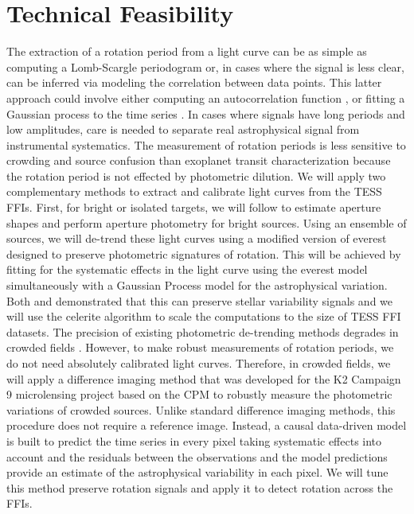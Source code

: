 \documentclass[useAMS, usenatbib, preprint, 12pt]{aastex}
\begin{document}
\section{Technical Feasibility}
The extraction of a rotation period from a light curve can be as simple as
computing a Lomb-Scargle periodogram or, in cases where the signal is less
clear, can be inferred via modeling the correlation between data points.
This latter approach could involve either computing an autocorrelation
function \citep{mcquillan2013}, or fitting a Gaussian process to the time
series \citep{angus2017, foreman-mackey2017}.
In cases where signals have long periods and low amplitudes, care is needed to
separate real astrophysical signal from instrumental systematics.
The measurement of rotation periods is less sensitive to crowding and source
confusion than exoplanet transit characterization because the rotation period
is not effected by photometric dilution.
We will apply two complementary methods to extract and calibrate light curves
from the TESS FFIs.
First, for bright or isolated targets, we will follow \citet{montet2017} to
estimate aperture shapes and perform aperture photometry for bright sources.
Using an ensemble of sources, we will de-trend these light curves using a
modified version of \textsf{everest} \citep{luger2016, luger2017} designed to
preserve photometric signatures of rotation.
This will be achieved by fitting for the systematic effects in the light curve
using the \textsf{everest} model simultaneously with a Gaussian Process model
for the astrophysical variation.
Both \citet{aigrain2016} and \citet{luger2016} demonstrated that this can
preserve stellar variability signals and we will use the \textsf{celerite}
algorithm \citep{dfm2017} to scale the computations to the size of TESS FFI
datasets.
The precision of existing photometric de-trending methods degrades in crowded
fields \citep[for example,][]{luger2017}.
However, to make robust measurements of rotation periods, we do not need
absolutely calibrated light curves.
Therefore, in crowded fields, we will apply a difference imaging method that
was developed for the K2 Campaign 9 microlensing project \citep{henderson2016}
based on the \textsf{CPM} \citep{wang2016} to robustly measure the photometric
variations of crowded sources.
Unlike standard difference imaging methods, this procedure does not require a
reference image.
Instead, a causal data-driven model is built to predict the time series in
every pixel taking systematic effects into account and the residuals between
the observations and the model predictions provide an estimate of the
astrophysical variability in each pixel.
We will tune this method preserve rotation signals and apply it to detect
rotation across the FFIs.
\end{document}

